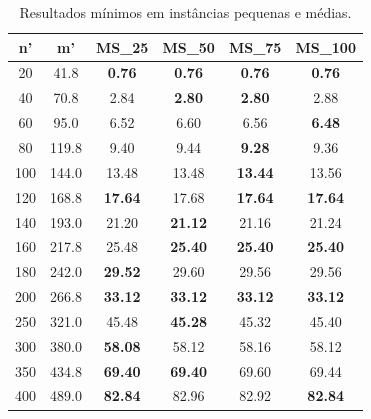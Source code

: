 \begin{table}[ht]
\footnotesize
\centering
\begin{minipage}{0.45\textwidth}
    \centering
    \caption{\small Resultados mínimos em instâncias pequenas e médias.}
        \begin{tabular}{|c|c|c|c|c|c|}
        \hline
        \rowcolor{gray!30} \textbf{n'} & \textbf{m'} & \textbf{MS\_25} & \textbf{MS\_50} & \textbf{MS\_75} & \textbf{MS\_100} \\
        \hline
        20 & 41.8 & \cellcolor{blue!20} \textbf{0.76} & \cellcolor{blue!20} \textbf{0.76} & \cellcolor{blue!20} \textbf{0.76} & \cellcolor{blue!20} \textbf{0.76} \\
        40 & 70.8 & 2.84 & \cellcolor{blue!20} \textbf{2.80} & \cellcolor{blue!20} \textbf{2.80} & 2.88 \\
        60 & 95.0 & 6.52 & 6.60 & 6.56 & \cellcolor{blue!20} \textbf{6.48} \\
        80 & 119.8 & 9.40 & 9.44 & \cellcolor{blue!20} \textbf{9.28} & 9.36 \\
        100 & 144.0 & 13.48 & 13.48 & \cellcolor{blue!20} \textbf{13.44} & 13.56 \\
        120 & 168.8 & \cellcolor{blue!20} \textbf{17.64} & 17.68 & \cellcolor{blue!20} \textbf{17.64} & \cellcolor{blue!20} \textbf{17.64} \\
        140 & 193.0 & 21.20 & \cellcolor{blue!20} \textbf{21.12} & 21.16 & 21.24 \\
        160 & 217.8 & 25.48 & \cellcolor{blue!20} \textbf{25.40} & \cellcolor{blue!20} \textbf{25.40} & \cellcolor{blue!20} \textbf{25.40} \\
        180 & 242.0 & \cellcolor{blue!20} \textbf{29.52} & 29.60 & 29.56 & 29.56 \\
        200 & 266.8 & \cellcolor{blue!20} \textbf{33.12} & \cellcolor{blue!20} \textbf{33.12} & \cellcolor{blue!20} \textbf{33.12} & \cellcolor{blue!20} \textbf{33.12} \\
        250 & 321.0 & 45.48 & \cellcolor{blue!20} \textbf{45.28} & 45.32 & 45.40 \\
        300 & 380.0 & \cellcolor{blue!20} \textbf{58.08} & 58.12 & 58.16 & 58.12 \\
        350 & 434.8 & \cellcolor{blue!20} \textbf{69.40} & \cellcolor{blue!20} \textbf{69.40} & 69.60 & 69.44 \\
        400 & 489.0 & \cellcolor{blue!20} \textbf{82.84} & 82.96 & 82.92 & \cellcolor{blue!20} \textbf{82.84} \\

\end{tabular}
\end{minipage}
\end{table}
